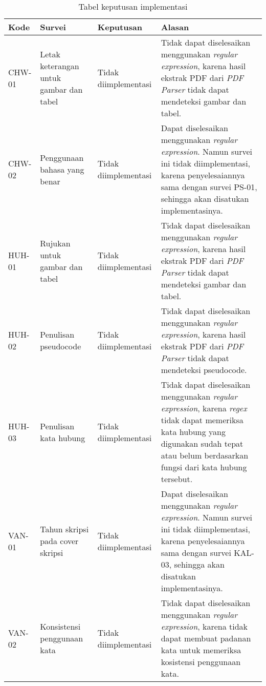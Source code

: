 \begin{table}[H]
	\renewcommand{\arraystretch}{1.5}
	\caption {Tabel keputusan implementasi} \label{tab:keputusan3}
	\begin{center}
		\begin{tabular}{|p{1.5 cm}|>{\raggedright} p{4 cm}| p{2.5 cm}| p{6.5 cm}|}
		\hline
		Kode & Survei & Keputusan & Alasan \\ 
		\hline 
		CHW-01 & Letak keterangan untuk gambar dan tabel & Tidak \newline diimplementasi & Tidak dapat diselesaikan menggunakan \textit{regular expression}, karena hasil ekstrak PDF dari \textit{PDF Parser} tidak dapat mendeteksi gambar dan tabel.\newline \\ 
		\hline 
		CHW-02 & Penggunaan bahasa yang benar & Tidak \newline diimplementasi & Dapat diselesaikan menggunakan \textit{regular expression}. Namun survei ini tidak diimplementasi, karena penyelesaiannya sama dengan survei PS-01, sehingga akan disatukan implementasinya. \newline \\		
		\hline
		HUH-01 & Rujukan untuk gambar dan tabel & Tidak \newline diimplementasi & Tidak dapat diselesaikan menggunakan \textit{regular expression}, karena hasil ekstrak PDF dari \textit{PDF Parser} tidak dapat mendeteksi gambar dan tabel. \newline \\ 
		\hline 
		HUH-02 & Penulisan pseudocode & Tidak \newline diimplementasi & Tidak dapat diselesaikan menggunakan \textit{regular expression}, karena hasil ekstrak PDF dari \textit{PDF Parser} tidak dapat mendeteksi pseudocode. \newline \\ 
		\hline 
		HUH-03 & Penulisan kata hubung & Tidak \newline diimplementasi & Tidak dapat diselesaikan menggunakan \textit{regular expression}, karena \textit{regex} tidak dapat memeriksa kata hubung yang digunakan sudah tepat atau belum berdasarkan fungsi dari kata hubung tersebut. \newline \\ 
		\hline 
		VAN-01 & Tahun skripsi pada cover skripsi & Tidak \newline diimplementasi & Dapat diselesaikan menggunakan \textit{regular expression}. Namun survei ini tidak diimplementasi, karena penyelesaiannya sama dengan survei KAL-03, sehingga
akan disatukan implementasinya. \newline \\ 
		\hline 
		VAN-02 & Konsistensi penggunaan kata & Tidak \newline diimplementasi & Tidak dapat diselesaikan menggunakan \textit{regular expression}, karena \newline tidak dapat membuat padanan kata untuk memeriksa kosistensi penggunaan kata. \\ 
		\hline
		\end{tabular}
	\end{center}
\end{table}

